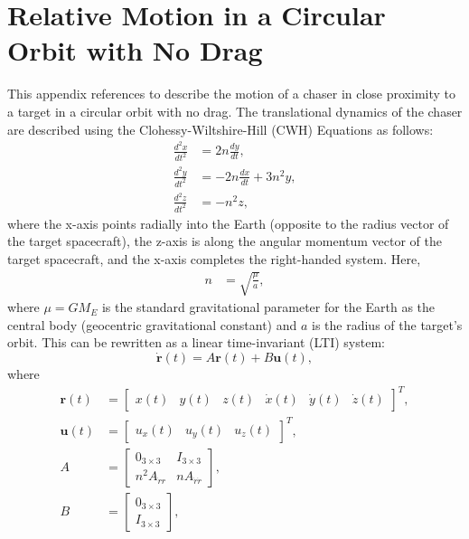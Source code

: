 \appendix

\chapter{Relative Motion in a Circular Orbit with No Drag} \label{app:cwh-equations}
This appendix references \cite{clohessy1960terminal} to describe the motion of a chaser in close proximity to a target in a circular orbit with no drag.
The translational dynamics of the chaser are described using the Clohessy-Wiltshire-Hill (CWH) Equations as follows:
\begin{subequations}
\begin{align}
    \frac{d^2x}{dt^2}&=2n\frac{dy}{dt},\\
    \frac{d^2y}{dt^2}&=-2n\frac{dx}{dt}+3n^2y,\\
    \frac{d^2z}{dt^2}&=-n^2z,
\end{align}
\end{subequations}
where the x-axis points radially into the Earth (opposite to the radius vector of the target spacecraft), the z-axis is along the angular momentum vector of the target spacecraft, and the x-axis completes the right-handed system.
Here,
\begin{align}
    n&=\sqrt{\frac{\mu}{a}},
\end{align}
where $\mu=GM_E$ is the standard gravitational parameter for the Earth as the central body (geocentric gravitational constant) and $a$ is the radius of the target's orbit.
This can be rewritten as a linear time-invariant (LTI) system:
\begin{equation}
    \dot{\boldsymbol{r}}(t)=A\boldsymbol{r}(t)+B\boldsymbol{u}(t),
\end{equation}
where
\begin{subequations}
\begin{align}
    \boldsymbol{r}(t)&=\begin{bmatrix}
    x(t)&y(t)&z(t)&\dot{x}(t)&\dot{y}(t)&\dot{z}(t)
    \end{bmatrix}^T,\\
    \boldsymbol{u}(t)&=\begin{bmatrix}
    u_x(t)&u_y(t)&u_z(t)
    \end{bmatrix}^T,\\
    A&=\begin{bmatrix}
        0_{3\times3}&I_{3\times3}\\
        n^2A_{\dot{r}r}&nA_{\dot{r}\dot{r}}
    \end{bmatrix},\\
    B&=\begin{bmatrix}
        0_{3\times3}\\
        I_{3\times3}
    \end{bmatrix},
\end{align}
\end{subequations}
